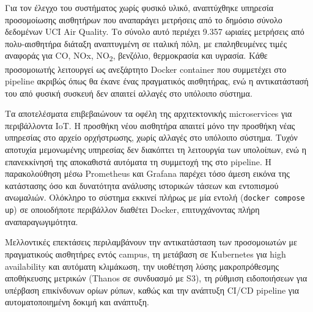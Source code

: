 Για τον έλεγχο του συστήματος χωρίς φυσικό υλικό, αναπτύχθηκε υπηρεσία προσομοίωσης αισθητήρων που αναπαράγει μετρήσεις από το δημόσιο σύνολο δεδομένων UCI Air Quality. Το σύνολο αυτό περιέχει 9.357 ωριαίες μετρήσεις από πολυ-αισθητήρα διάταξη αναπτυγμένη σε ιταλική πόλη, με επαληθευμένες τιμές αναφοράς για CO, NOx, NO\textsubscript{2}, βενζόλιο, θερμοκρασία και υγρασία. Κάθε προσομοιωτής λειτουργεί ως ανεξάρτητο Docker container που συμμετέχει στο pipeline ακριβώς όπως θα έκανε ένας πραγματικός αισθητήρας, ενώ η αντικατάστασή του από φυσική συσκευή δεν απαιτεί αλλαγές στο υπόλοιπο σύστημα.

Τα αποτελέσματα επιβεβαιώνουν τα οφέλη της αρχιτεκτονικής microservices για περιβάλλοντα IoT. Η προσθήκη νέου αισθητήρα απαιτεί μόνο την προσθήκη νέας υπηρεσίας στο αρχείο ορχήστρωσης, χωρίς αλλαγές στο υπόλοιπο σύστημα. Τυχόν αποτυχία μεμονωμένης υπηρεσίας δεν διακόπτει τη λειτουργία των υπολοίπων, ενώ η επανεκκίνησή της αποκαθιστά αυτόματα τη συμμετοχή της στο pipeline. Η παρακολούθηση μέσω Prometheus και Grafana παρέχει τόσο άμεση εικόνα της κατάστασης όσο και δυνατότητα ανάλυσης ιστορικών τάσεων και εντοπισμού ανωμαλιών. Ολόκληρο το σύστημα εκκινεί πλήρως με μία εντολή (\texttt{docker compose up}) σε οποιοδήποτε περιβάλλον διαθέτει Docker, επιτυγχάνοντας πλήρη αναπαραγωγιμότητα.

Μελλοντικές επεκτάσεις περιλαμβάνουν την αντικατάσταση των προσομοιωτών με πραγματικούς αισθητήρες εντός campus, τη μετάβαση σε Kubernetes για high availability και αυτόματη κλιμάκωση, την υιοθέτηση λύσης μακροπρόθεσμης αποθήκευσης μετρικών (Thanos σε συνδυασμό με S3), τη ρύθμιση ειδοποιήσεων για υπέρβαση επικίνδυνων ορίων ρύπων, καθώς και την ανάπτυξη CI/CD pipeline για αυτοματοποιημένη δοκιμή και ανάπτυξη.
